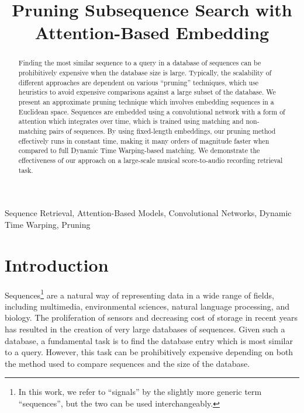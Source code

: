 \documentclass{article}
\title{Pruning Subsequence Search with Attention-Based Embedding}
\begin{document}
\ninept
\maketitle

\begin{abstract}
Finding the most similar sequence to a query in a database of sequences can be prohibitively expensive when the database size is large.
Typically, the scalability of different approaches are dependent on various ``pruning'' techniques, which use heuristics to avoid expensive comparisons against a large subset of the database.
We present an approximate pruning technique which involves embedding sequences in a Euclidean space.
Sequences are embedded using a convolutional network with a form of attention which integrates over time, which is trained using matching and non-matching pairs of sequences.
By using fixed-length embeddings, our pruning method effectively runs in constant time, making it many orders of magnitude faster when compared to full Dynamic Time Warping-based matching.
We demonstrate the effectiveness of our approach on a large-scale musical score-to-audio recording retrieval task.
\end{abstract}

\begin{keywords}
Sequence Retrieval, Attention-Based Models, Convolutional Networks, Dynamic Time Warping, Pruning
\end{keywords}

\section{Introduction}
\label{sec:intro}

Sequences\footnote{In this work, we refer to ``signals'' by the slightly more generic term ``sequences'', but the two can be used interchangeably.} are a natural way of representing data in a wide range of fields, including multimedia, environmental sciences, natural language processing, and biology.
The proliferation of sensors and decreasing cost of storage in recent years has resulted in the creation of very large databases of sequences.
Given such a database, a fundamental task is to find the database entry which is most similar to a query.
However, this task can be prohibitively expensive depending on both the method used to compare sequences and the size of the database.
\end{document}
